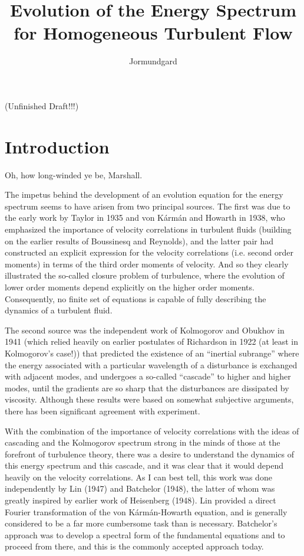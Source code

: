 \documentclass[letterpaper, 11pt, onecolumn, oneside]{article}
\title{Evolution of the Energy Spectrum for Homogeneous Turbulent Flow}
\author{Jormundgard}
\begin{document}
\maketitle

(Unfinished Draft!!!)

\section{Introduction}

Oh, how long-winded ye be, Marshall.

The impetus behind the development of an evolution equation for the energy spectrum seems to have arisen from two principal sources. The first was due to the early work by Taylor in 1935 and von K\'arm\'an and Howarth in 1938, who emphasized the importance of velocity correlations in turbulent fluids (building on the earlier results of Boussinesq and Reynolds), and the latter pair had constructed an explicit expression for the velocity correlations (i.e. second order moments) in terms of the third order moments of velocity. And so they clearly illustrated the so-called closure problem of turbulence, where the evolution of lower order moments depend explicitly on the higher order moments. Consequently, no finite set of equations is capable of fully describing the dynamics of a turbulent fluid.

The second source was the independent work of Kolmogorov and Obukhov in 1941 (which relied heavily on earlier postulates of Richardson in 1922 (at least in Kolmogorov's case!)) that predicted the existence of an ``inertial subrange'' where the energy associated with a particular wavelength of a disturbance is exchanged with adjacent modes, and undergoes a so-called ``cascade'' to higher and higher modes, until the gradients are so sharp that the disturbances are dissipated by viscosity. Although these results were based on somewhat subjective arguments, there has been significant agreement with experiment.

With the combination of the importance of velocity correlations with the ideas of cascading and the Kolmogorov spectrum strong in the minds of those at the forefront of turbulence theory, there was a desire to understand the dynamics of this energy spectrum and this cascade, and it was clear that it would depend heavily on the velocity correlations. As I can best tell, this work was done independently by Lin (1947) and Batchelor (1948), the latter of whom was greatly inspired by earlier work of Heisenberg (1948). Lin provided a direct Fourier transformation of the von K\'arm\'an-Howarth equation, and is generally considered to be a far more cumbersome task than is necessary. Batchelor's approach was to develop a spectral form of the fundamental equations and to proceed from there, and this is the commonly accepted approach today.
\end{document}
